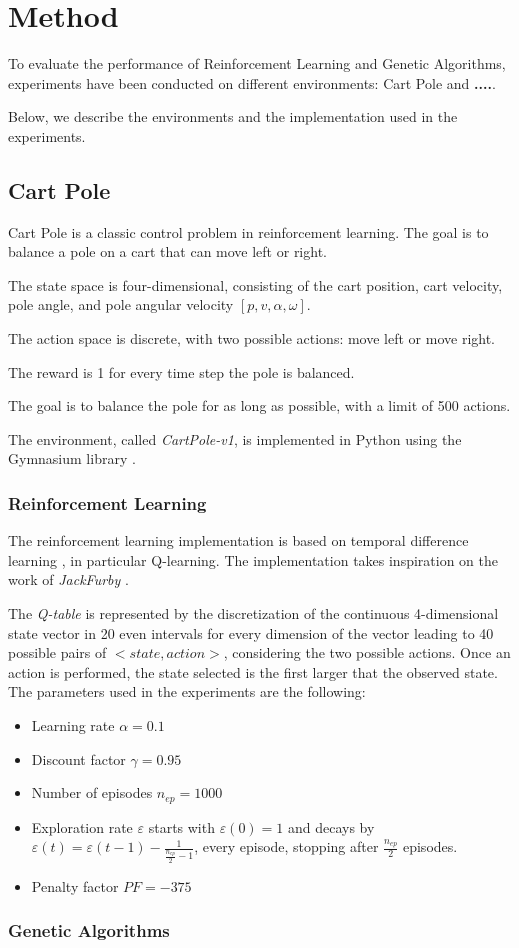 \section{Method}
To evaluate the performance of Reinforcement Learning and Genetic Algorithms,
experiments have been conducted on different environments:
Cart Pole and \textbf{....}.

Below, we describe the environments and the implementation used in the experiments.
\subsection{Cart Pole}
Cart Pole is a classic control problem in reinforcement learning. 
The goal is to balance a pole on a cart that can move left or right. 

The state space is four-dimensional, consisting of the cart position, cart velocity, pole angle, and pole angular velocity $[p, v, \alpha, \omega]$. 

The action space is discrete, with two possible actions: move left or move right. 

The reward is 1 for every time step the pole is balanced.

The goal is to balance the pole for as long as possible, with a limit of 500 actions.

The environment, called \textit{CartPole-v1}, is implemented in Python using the Gymnasium library \cite{towers_gymnasium_2023}.

\subsubsection{Reinforcement Learning}
The reinforcement learning implementation is based on temporal difference learning \cite{sutton1998temporal}, 
in particular Q-learning.
The implementation takes inspiration on the work of \textit{JackFurby} \cite{JackFurbyCartPole}.

The \textit{Q-table} is represented by the discretization of the continuous 4-dimensional state vector in 20 even intervals for every dimension of the vector leading to 40 possible pairs of $<state,action>$, considering the two possible actions.
Once an action is performed, the state selected is the first larger that the observed state.\\
The parameters used in the experiments are the following:
\begin{itemize}
	\item Learning rate $\alpha = 0.1$
	\item Discount factor $\gamma = 0.95$
	\item Number of episodes $n_{ep} = 1000$
	\item Exploration rate $\varepsilon$ starts with $\varepsilon(0)=1$ and decays by $\varepsilon(t) = \varepsilon(t - 1) - \frac{1}{\frac{n_{ep}}{2} - 1}$, every episode, stopping after $\frac{n_{ep}}{2}$ episodes.
	\item Penalty factor $PF = -375$
\end{itemize}
\subsubsection{Genetic Algorithms}
